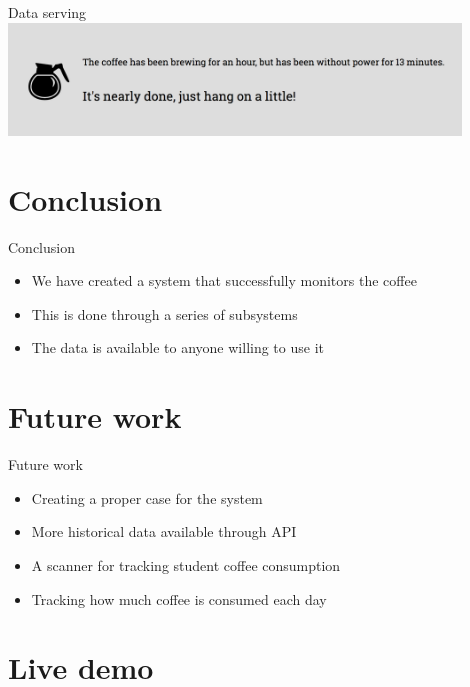 \documentclass[presentation]{beamer}
\begin{document}
\begin{frame}[label={sec:org8222a43}]{Data serving}
\includegraphics[width=0.9\textwidth]{figures/brewing}
\end{frame}
\section{Conclusion}
\label{sec:org3960dc8}
\begin{frame}[label={sec:org75f1a67}]{Conclusion}
\begin{itemize}
\item We have created a system that successfully monitors the coffee
\item This is done through a series of subsystems
\item The data is available to anyone willing to use it
\end{itemize}
\end{frame}
\section{Future work}
\label{sec:org362679c}
\begin{frame}[label={sec:org7a4914a}]{Future work}
\begin{itemize}
\item Creating a proper case for the system
\item More historical data available through API
\item A scanner for tracking student coffee consumption
\item Tracking how much coffee is consumed each day
\end{itemize}
\end{frame}
\section{Live demo}
\label{sec:org1de1029}
\end{document}
